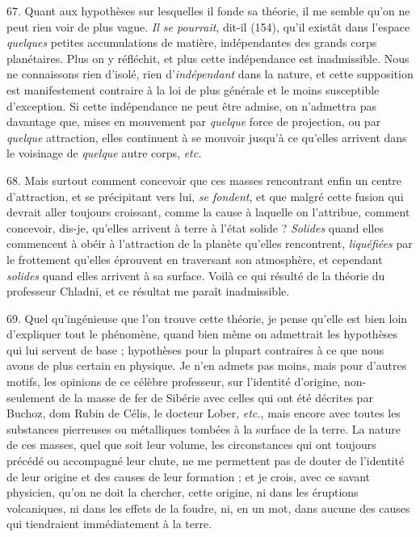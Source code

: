 \documentclass[a4paper, 11pt, oneside, polutonikogreek, french]{article}
\begin{document}
67. Quant aux hypothèses sur lesquelles il fonde sa théorie, il me semble qu'on ne peut rien voir de plus vague. \og \emph{Il se pourrait}, dit-il (154), qu'il existât dans l'espace \emph{quelques} petites accumulations de matière, indépendantes des grands corps planétaires. \fg Plus on y réfléchit, et plus cette indépendance est inadmissible. Nous ne connaissons rien d'isolé, rien d'\emph{indépendant} dans la nature, et cette supposition est manifestement contraire à la loi de plus générale et le moins susceptible d'exception. Si cette indépendance ne peut être admise, on n'admettra pas davantage que, mises en mouvement par \emph{quelque} force de projection, ou par \emph{quelque} attraction, elles continuent à se mouvoir jusqu'à ce qu'elles arrivent dans le voisinage de \emph{quelque} autre corps, \emph{etc.}

68. Mais surtout comment concevoir que ces masses rencontrant enfin un centre d'attraction, et se précipitant vers lui, \emph{se fondent}, et que malgré cette fusion qui devrait aller toujours croissant, comme la cause à laquelle on l'attribue, comment concevoir, dis-je, qu'elles arrivent à terre à l'état solide ? \emph{Solides} quand elles commencent à obéir à l'attraction de la planète qu'elles rencontrent, \emph{liquéfiées} par le frottement qu'elles éprouvent en traversant son atmosphère, et cependant \emph{solides} quand elles arrivent à sa surface. Voilà ce qui résulté de la théorie du professeur Chladni, et ce résultat me paraît inadmissible.

69. Quel qu’ingénieuse que l'on trouve cette théorie, je pense qu'elle est bien loin d'expliquer tout le phénomène, quand bien même on admettrait les hypothèses qui lui servent de base ; hypothèses pour la plupart contraires à ce que nous avons de plus certain en physique. Je n'en admets pas moins, mais pour d'autres motifs, les opinions de ce célèbre professeur, sur l'identité d'origine, non-seulement de la masse de fer de Sibérie avec celles qui ont été décrites par Buchoz, dom Rubin de Célis, le docteur Lober, \emph{etc.}, mais encore avec toutes les substances pierreuses ou métalliques tombées à la surface de la terre. La nature de ces masses, quel que soit leur volume, les circonstances qui ont toujours précédé ou accompagné leur chute, ne me permettent pas de douter de l'identité de leur origine et des causes de leur formation ; et je crois, avec ce savant physicien, qu'on ne doit la chercher, cette origine, ni dans les éruptions volcaniques, ni dans les effets de la foudre, ni, en un mot, dans aucune des causes qui tiendraient immédiatement à la terre.
\end{document}
